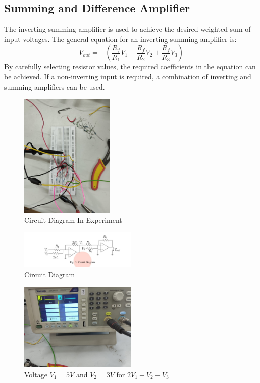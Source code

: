 \documentclass[a4paper,12pt]{article}
\begin{document}
\subsection{Summing and Difference Amplifier}
The inverting summing amplifier is used to achieve the desired weighted sum of input voltages. The general equation for an inverting summing amplifier is:
\begin{equation}
    V_{out} = -\left( \frac{R_f}{R_1} V_1 + \frac{R_f}{R_2} V_2 + \frac{R_f}{R_3} V_3 \right)
\end{equation}
By carefully selecting resistor values, the required coefficients in the equation can be achieved. If a non-inverting input is required, a combination of inverting and summing amplifiers can be used.
\begin{figure}[H]
    \centering
    \includegraphics[width=0.4\textwidth]{figs/addercircuit.png}
    \caption{Circuit Diagram In Experiment}
\end{figure}
\begin{figure}[H]
    \centering
    \includegraphics[width=0.5\textwidth]{figs/adder_ideal.png}
    \caption{Circuit Diagram}
\end{figure}
\begin{figure}[H]
    \centering
    \includegraphics[width=0.5\textwidth]{figs/adderv1v2.png}
    \caption{Voltage $V_1 = 5V$ and $V_2 = 3V$ for $2V_1 + V_2 - V_3$}
\end{figure}
\end{document}

